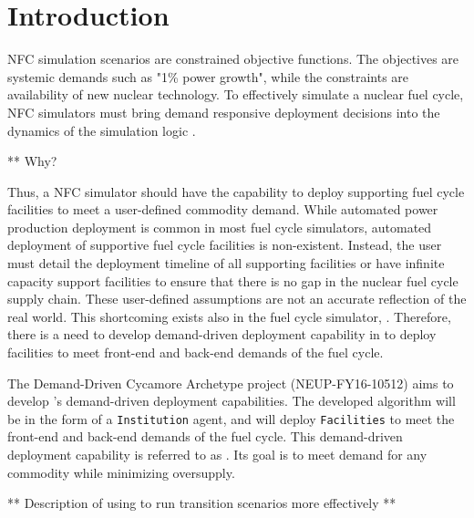 \section{Introduction}
\gls{NFC} simulation scenarios are constrained objective functions. 
The objectives are systemic demands such as "1\% power growth", 
while the constraints are availability of new nuclear technology.
To effectively simulate a nuclear fuel cycle, \gls{NFC} simulators 
must bring demand responsive deployment decisions into the dynamics
of the simulation logic \cite{huff_current_2017}. 

** Why? 

Thus, a \gls{NFC} simulator should have the capability to deploy 
supporting fuel cycle facilities to meet a user-defined commodity
demand. 
While automated power production deployment is common in most fuel
cycle simulators, automated deployment of supportive fuel cycle 
facilities is non-existent. 
Instead, the user must detail the deployment timeline of all 
supporting facilities or have infinite capacity support facilities
to ensure that there is no gap in the nuclear fuel cycle supply 
chain. 
These user-defined assumptions are not an accurate reflection 
of the real world. 
This shortcoming exists also in the fuel cycle simulator, \Cyclus. 
Therefore, there is a need to develop demand-driven deployment 
capability in \Cyclus to deploy facilities to meet front-end and 
back-end demands of the fuel cycle.

The Demand-Driven Cycamore Archetype project (NEUP-FY16-10512) 
aims to develop \Cyclus's demand-driven deployment capabilities. 
The developed algorithm will be in the form of a \Cyclus 
\texttt{Institution} agent, and will deploy \texttt{Facilities} 
to meet the front-end and back-end demands of the fuel cycle.
This demand-driven deployment capability is referred to as 
\deploy. 
Its goal is to meet demand for any commodity while minimizing 
oversupply. 

** Description of using \deploy to run transition scenarios more effectively ** 
